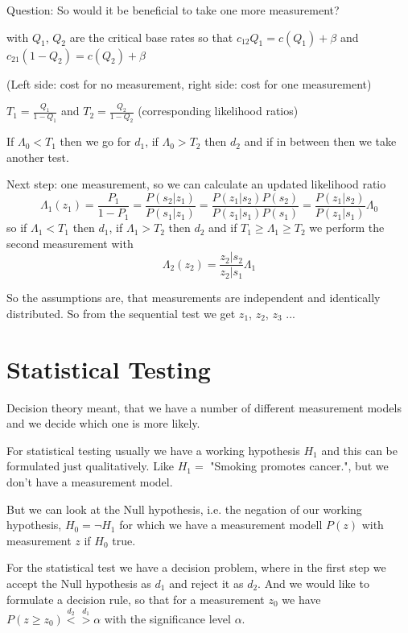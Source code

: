 \documentclass{notebook}
\begin{document}
Question: So would it be beneficial to take one more measurement?

with $Q_1$, $Q_2$ are the critical base rates so that $c_{12} Q_1 = c(Q_1) + \beta$ and $c_{21} (1-Q_2) = c(Q_2) + \beta$

(Left side: cost for no measurement, right side: cost for one measurement)

$T_1 = \frac{Q_1}{1-Q_1}$ and $T_2 = \frac{Q_2}{1-Q_2}$ (corresponding likelihood ratios)

If $\Lambda_0 < T_1$ then we go for $d_1$, if $\Lambda_0 > T_2$ then $d_2$ and if in between then we take another test.

Next step: one measurement, so we can calculate an updated likelihood ratio 
%
\begin{equation}
\Lambda_1(z_1) = \frac{P_1}{1-P_1} = \frac{P(s_2|z_1)}{P(s_1|z_1)} = \frac{P(z_1|s_2)P(s_2)}{P(z_1|s_1) P(s_1)} = \frac{P(z_1|s_2)}{P(z_1|s_1)} \Lambda_0
\end{equation}
%
so if $\Lambda_1 < T_1$ then $d_1$, if $\Lambda_1 > T_2$ then $d_2$ and if $T_1 \geq \Lambda_1 \geq T_2$ we perform the second measurement with
%
\begin{equation}
\Lambda_2(z_2) = \frac{z_2|s_2}{z_2|s_1} \Lambda_1
\end{equation}
%

So the assumptions are, that measurements are independent and identically distributed. So from the sequential test we get $z_1$, $z_2$, $z_3$ ...

\section{Statistical Testing}

Decision theory meant, that we have a number of different measurement models and we decide which one is more likely. 

For statistical testing usually we have a working hypothesis $H_1$ and this can be formulated just qualitatively. Like $H_1 = $ "Smoking promotes cancer.", but we don't have a measurement model. 

But we can look at the Null hypothesis, i.e. the negation of our working hypothesis, $H_0 = \neg H_1$ for which we have a measurement modell $P(z)$ with measurement $z$ if $H_0$ true.

For the statistical test we have a decision problem, where in the first step we accept the Null hypothesis as $d_1$ and reject it as $d_2$. And we would like to formulate a decision rule, so that for a measurement $z_0$ we have $P(z \geq z_0) \overset{d_2}{<} \overset{d_1}{>} \alpha$ with the significance level $\alpha$.
\end{document}
